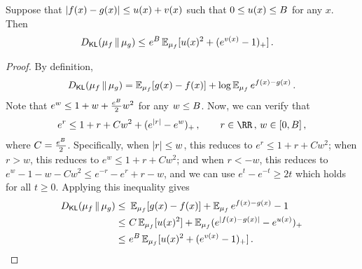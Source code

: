 \begin{lemma}\label{lem:KL-decomp}
Suppose that $\lvert f(x)-g(x)\rvert\leq u(x)+v(x)$ such that $0\leq u(x)\leq B$ for any $x$. Then
\begin{align*}
    \Dkl{\mu_f}{\mu_g}
    \leq&~ e^\B \En_{\mu_f}[u(x)^2+(e^{v(x)}-1)_+]\,.
\end{align*}
\end{lemma}
\begin{proof}
By definition,
\begin{align*}
    \Dkl{\mu_f}{\mu_g}=\En_{\mu_f}[g(x)-f(x)]+\log \En_{\mu_f} e^{f(x)-g(x)}\,.
\end{align*}
Note that $e^{w}\leq 1+w+\frac{e^B}{2}w^2$ for any $w\leq B$. Now, we can verify that 
\begin{align*}
    e^r\leq 1+r+Cw^2+(e^{\abs{r}}-e^w)_+\,, \qquad r\in\RR\,,\, w\in[0,\B]\,,
\end{align*}
where $C=\frac{e^B}{2}$. Specifically, when $\lvert r\rvert\leq w$, this reduces to $e^r\leq 1+r+Cw^2$; when $r>w$, this reduces to $e^w\leq 1+r+Cw^2$; and when $r<-w$, this reduces to $e^w-1-w-Cw^2\leq e^{-r}-e^{r}+r-w$, and we can use $e^t-e^{-t}\geq 2t$ which holds for all $t\geq0$. Applying this inequality gives
\begin{align*}
    \Dkl{\mu_f}{\mu_g}\leq &~
    \En_{\mu_f}[g(x)-f(x)]+\En_{\mu_f} e^{f(x)-g(x)}-1 \\
    \leq&~ C\En_{\mu_f}[u(x)^2]+\En_{\mu_f}(e^{\abs{f(x)-g(x)}}-e^{u(x)})_+ \\
    \leq&~ e^\B \En_{\mu_f}[u(x)^2+(e^{v(x)}-1)_+]\,.
\end{align*}
\end{proof}

